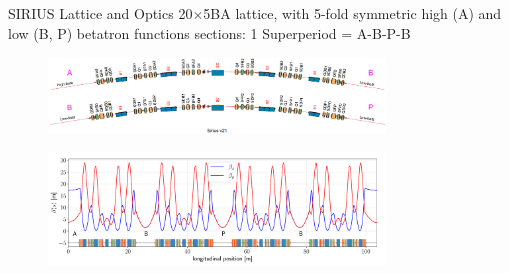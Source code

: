 \documentclass[aspectratio=169]{beamer}
\begin{document}
\begin{frame}{SIRIUS Lattice and Optics}
20$\times$5BA lattice, with 5-fold symmetric high (A) and low (B, P) betatron functions sections:  1 Superperiod = A-B-P-B
    \begin{figure}
        \centering
        \includegraphics[width=0.8\textwidth]{SI_superperiod.png}
    \end{figure}
    \begin{figure}
        \includegraphics[width=0.8\textwidth]{beta_functions.pdf}
    \end{figure}
\end{frame}
\end{document}
